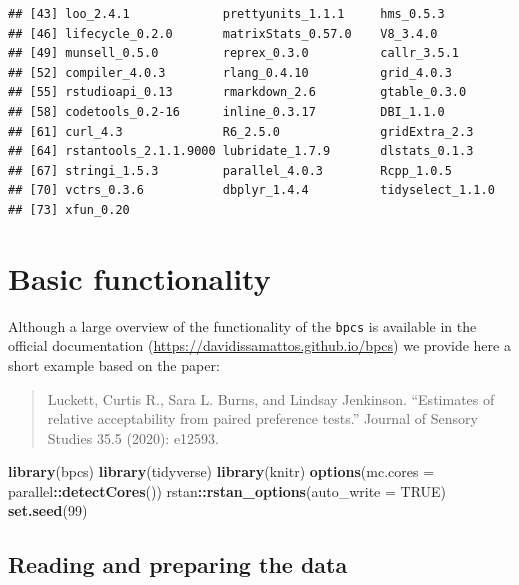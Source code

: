 \documentclass[
]{book}
\newenvironment{Shaded}{\begin{snugshade}}{\end{snugshade}}
\newcommand{\DataTypeTok}[1]{\textcolor[rgb]{0.13,0.29,0.53}{#1}}
\newcommand{\DecValTok}[1]{\textcolor[rgb]{0.00,0.00,0.81}{#1}}
\newcommand{\KeywordTok}[1]{\textcolor[rgb]{0.13,0.29,0.53}{\textbf{#1}}}
\newcommand{\NormalTok}[1]{#1}
\newcommand{\OperatorTok}[1]{\textcolor[rgb]{0.81,0.36,0.00}{\textbf{#1}}}
\newcommand{\OtherTok}[1]{\textcolor[rgb]{0.56,0.35,0.01}{#1}}
\begin{document}
\begin{verbatim}
## [43] loo_2.4.1             prettyunits_1.1.1     hms_0.5.3            
## [46] lifecycle_0.2.0       matrixStats_0.57.0    V8_3.4.0             
## [49] munsell_0.5.0         reprex_0.3.0          callr_3.5.1          
## [52] compiler_4.0.3        rlang_0.4.10          grid_4.0.3           
## [55] rstudioapi_0.13       rmarkdown_2.6         gtable_0.3.0         
## [58] codetools_0.2-16      inline_0.3.17         DBI_1.1.0            
## [61] curl_4.3              R6_2.5.0              gridExtra_2.3        
## [64] rstantools_2.1.1.9000 lubridate_1.7.9       dlstats_0.1.3        
## [67] stringi_1.5.3         parallel_4.0.3        Rcpp_1.0.5           
## [70] vctrs_0.3.6           dbplyr_1.4.4          tidyselect_1.1.0     
## [73] xfun_0.20
\end{verbatim}

\hypertarget{basics}{%
\chapter{Basic functionality}\label{basics}}

Although a large overview of the functionality of the \texttt{bpcs} is available in the official documentation (\url{https://davidissamattos.github.io/bpcs}) we provide here a short example based on the paper:

\begin{quote}
Luckett, Curtis R., Sara L. Burns, and Lindsay Jenkinson. ``Estimates of relative acceptability from paired preference tests.'' Journal of Sensory Studies 35.5 (2020): e12593.
\end{quote}

\begin{Shaded}
\begin{Highlighting}[]
\KeywordTok{library}\NormalTok{(bpcs)}
\KeywordTok{library}\NormalTok{(tidyverse)}
\KeywordTok{library}\NormalTok{(knitr)}
\KeywordTok{options}\NormalTok{(}\DataTypeTok{mc.cores =}\NormalTok{ parallel}\OperatorTok{::}\KeywordTok{detectCores}\NormalTok{())}
\NormalTok{rstan}\OperatorTok{::}\KeywordTok{rstan_options}\NormalTok{(}\DataTypeTok{auto_write =} \OtherTok{TRUE}\NormalTok{)}
\KeywordTok{set.seed}\NormalTok{(}\DecValTok{99}\NormalTok{)}
\end{Highlighting}
\end{Shaded}

\hypertarget{reading-and-preparing-the-data}{%
\section{Reading and preparing the data}\label{reading-and-preparing-the-data}}
\end{document}
